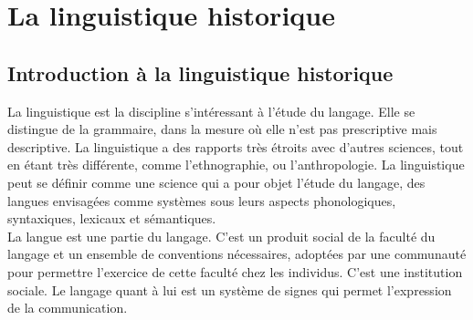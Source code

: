 \documentclass[12pt, french, twoside]{report}
\begin{document}
\section{La linguistique historique}
\subsection{Introduction à la linguistique historique}


La linguistique est la discipline s'intéressant à l'étude du langage. Elle se distingue de la grammaire, dans la mesure où elle n'est pas prescriptive mais descriptive. La linguistique a des rapports très étroits avec d'autres sciences, tout en étant très différente, comme l'ethnographie, ou l'anthropologie. La linguistique peut se définir comme une science qui a pour objet l'étude du langage, des langues envisagées comme systèmes sous leurs aspects phonologiques, syntaxiques, lexicaux et sémantiques.\\

La langue est une partie du langage. C'est un produit social de la faculté du langage et un ensemble de conventions nécessaires, adoptées par une communauté pour permettre l'exercice de cette faculté chez les individus. C'est une institution sociale. Le langage quant à lui est un système de signes qui permet l'expression de la communication.\\

\end{document}
